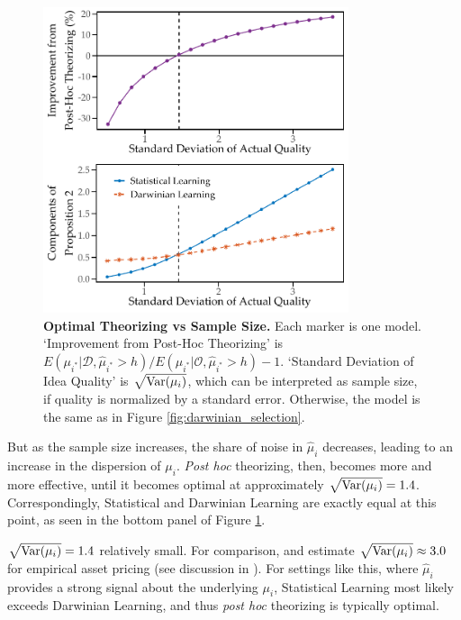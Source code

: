 \documentclass[12pt,english]{article}
\theoremstyle{plain}
\theoremstyle{plain}
\begin{document}
\begin{figure}
    \centering
    \includegraphics[width=0.8\textwidth]{exhibits/many-mu_sig.pdf}
    \caption{\textbf{Optimal Theorizing vs Sample Size.} Each marker is one model. `Improvement from Post-Hoc Theorizing' is $E\left(\mu_{i^{\ast}}|\mathcal{D}, \hat{\mu}_{i^{\ast}}>h\right)/E\left(\mu_{i^{\ast}}|\mathcal{O}, \hat{\mu}_{i^{\ast}}>h\right)-1$. `Standard Deviation of Idea Quality' is $\sqrt{\text{Var}(\mu_i)}$, which can be interpreted as sample size, if quality is normalized by a standard error. Otherwise, the model is the same as in Figure \ref{fig:darwinian_selection}.}
    \label{fig:prop2-bigdata}
\end{figure}


But as the sample size increases, the share of noise in $\hat{\mu}_i$ decreases, leading to an increase in the dispersion of $\mu_i$. \emph{Post hoc} theorizing, then, becomes more and more effective, until it becomes optimal at approximately $\sqrt{\text{Var}(\mu_i)}=1.4$. Correspondingly, Statistical and Darwinian Learning are exactly equal at this point, as seen in the bottom panel of Figure \ref{fig:prop2-bigdata}.

$\sqrt{\text{Var}(\mu_i)}=1.4$ relatively small. For comparison, \citet{chen2020publication} and \citet{jensen2023there} estimate $\sqrt{\text{Var}(\mu_i)}\approx 3.0$ for empirical asset pricing (see discussion in \citealt{chen2022publication}). For settings like this, where $\hat{\mu}_i$ provides a strong signal about the underlying $\mu_i$, Statistical Learning most likely exceeds Darwinian Learning, and thus \emph{post hoc} theorizing is typically optimal.
\end{document}

